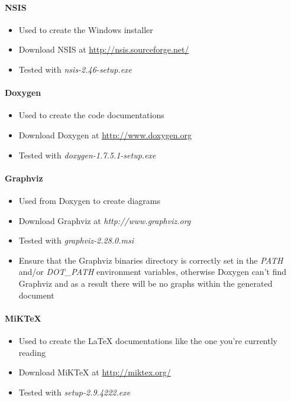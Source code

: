 \paragraph{\ac{NSIS}}
\begin{itemize}
\item{Used to create the Windows installer}
\item{Download \ac{NSIS} at \url{http://nsis.sourceforge.net/}}
\item{Tested with \emph{nsis-2.46-setup.exe}}
\end{itemize}


\paragraph{Doxygen}
\begin{itemize}
\item{Used to create the code documentations}
\item{Download Doxygen at \url{http://www.doxygen.org}}
\item{Tested with \emph{doxygen-1.7.5.1-setup.exe}}
\end{itemize}


\paragraph{Graphviz}
\begin{itemize}
\item{Used from Doxygen to create diagrams}
\item{Download Graphviz at \emph{http://www.graphviz.org}}
\item{Tested with \emph{graphviz-2.28.0.msi}}
\item{Ensure that the Graphviz binaries directory is correctly set in the \emph{PATH} and/or \emph{DOT\_PATH} environment variables, otherwise Doxygen can't find Graphviz and as a result there will be no graphs within the generated document}
\end{itemize}


\paragraph{MiKTeX}
\begin{itemize}
\item{Used to create the \LaTeX{} documentations like the one you're currently reading}
\item{Download MiKTeX at \url{http://miktex.org/}}
\item{Tested with \emph{setup-2.9.4222.exe}}
\end{itemize}


